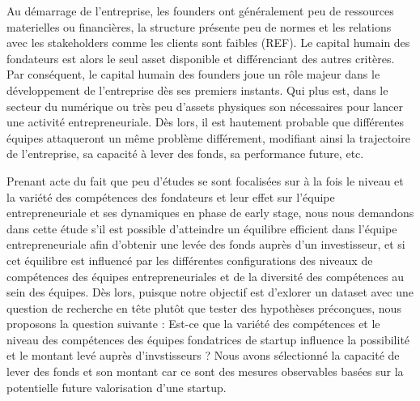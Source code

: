 \documentclass[12pt]{article}
\begin{document}
Au démarrage de l'entreprise, les founders ont généralement peu de ressources materielles ou financières, la structure présente peu de normes et les relations avec les stakeholders comme les clients sont faibles (REF). Le capital humain des fondateurs est alors le seul asset disponible et différenciant des autres critères. Par conséquent, le capital humain des founders joue un rôle majeur dans le développement de l'entreprise dès ses premiers instants. Qui plus est, dans le secteur du numérique ou très peu d'assets physiques son nécessaires pour lancer une activité entrepreneuriale. Dès lors, il est hautement probable que différentes équipes attaqueront un même problème différement, modifiant ainsi la trajectoire de l'entreprise, sa capacité à lever des fonds, sa performance future, etc.

Prenant acte du fait que peu d'études se sont focalisées sur à la fois le niveau et la variété des compétences des fondateurs et leur effet sur l'équipe entrepreneuriale et ses dynamiques en phase de early stage, nous nous demandons dans cette étude s'il est possible d'atteindre un équilibre efficient dans l'équipe entrepreneuriale afin d'obtenir une levée des fonds auprès d'un investisseur, et si cet équilibre est influencé par les différentes configurations des niveaux de compétences des équipes entrepreneuriales et de la diversité des compétences au sein des équipes. Dès lors, puisque notre objectif est d'exlorer un dataset avec une question de recherche en tête plutôt que tester des hypothèses préconçues, nous proposons la question suivante : Est-ce que la variété des compétences et le niveau des compétences des équipes fondatrices de startup influence la possibilité et le montant levé auprès d'invstisseurs ? Nous avons sélectionné la capacité de lever des fonds et son montant car ce sont des mesures observables basées sur la potentielle future valorisation d'une startup.
\end{document}
